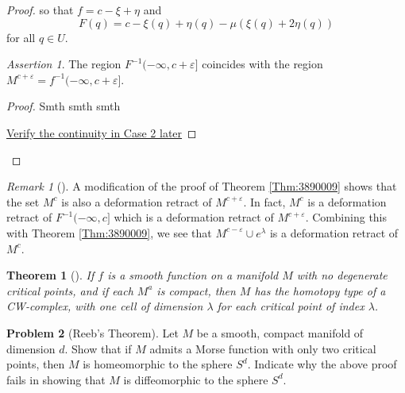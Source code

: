\documentclass[reqno]{amsart}
\newtheorem{theorem}{Theorem}[section]
\theoremstyle{definition}
\newtheorem{problem}[theorem]{Problem}
\theoremstyle{remark}
\newtheorem*{remark}{Remark}
\newtheorem*{assertion}{Assertion}
\begin{document}
\begin{proof}
    so that
    $f = c - \xi + \eta$ and
    \[
    F(q) = c - \xi (q) + \eta(q) -
    \mu \left( \xi(q) + 2 \eta(q) \right) 
    \] 
    for all $q \in U$.
    
    \begin{assertion}
        The region $F^{-1}(-\infty, c+\varepsilon]$ coincides
        with the region $M^{c+\varepsilon} = 
        f^{-1}(-\infty, c+\varepsilon]$.
    \end{assertion}

    \begin{proof}
        Smth smth smth

    \underline{Verify the continuity in Case 2 later}

    \end{proof}

    \end{proof}

    \begin{remark}[]
        A modification of the proof of
        Theorem \ref{Thm:3890009} shows that
        the set $M^{c}$ is also a deformation retract
        of $M^{c+\varepsilon}$. In fact,
        $M^{c}$ is a deformation retract of
        $F^{-1}(-\infty, c]$ which is a deformation
        retract of $M^{c+\varepsilon}$.
        Combining this with Theorem \ref{Thm:3890009},
        we see that
        $M^{c- \varepsilon} \cup  e^{\lambda}$ 
        is a deformation retract of
        $M^{c}$.
    \end{remark}

    \begin{theorem}[]
        If $f$ is a smooth function on a manifold
        $M$ with no degenerate critical points, and
        if each $M^{a}$ is compact, then
        $M$ has the homotopy type of a CW-complex,
        with one cell of dimension $\lambda$ for each
        critical point of index $\lambda$.
    \end{theorem}

\newpage

    \begin{problem}[Reeb's Theorem]
        Let $M$ be a smooth, compact manifold
        of dimension $d$. Show that if $M$ admits
        a Morse function with only two critical points, then
        $M$ is homeomorphic to the sphere $S^{d}$. Indicate
        why the above proof fails in showing that $M$ is
        diffeomorphic to the sphere $S^{d}$.
    \end{problem}

    
\end{document}
